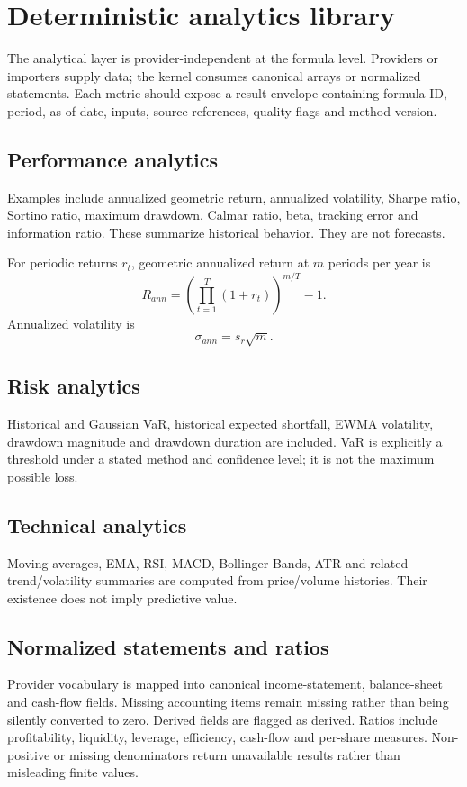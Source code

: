 \documentclass[11pt]{article}
\begin{document}
\section{Deterministic analytics library}
The analytical layer is provider-independent at the formula level. Providers or importers supply data; the kernel consumes canonical arrays or normalized statements. Each metric should expose a result envelope containing formula ID, period, as-of date, inputs, source references, quality flags and method version.

\subsection{Performance analytics}
Examples include annualized geometric return, annualized volatility, Sharpe ratio, Sortino ratio, maximum drawdown, Calmar ratio, beta, tracking error and information ratio. These summarize historical behavior. They are not forecasts.

For periodic returns $r_t$, geometric annualized return at $m$ periods per year is
\begin{equation}
R_{ann}=\left(\prod_{t=1}^T(1+r_t)\right)^{m/T}-1.
\end{equation}
Annualized volatility is
\begin{equation}
\sigma_{ann}=s_r\sqrt{m}.
\end{equation}

\subsection{Risk analytics}
Historical and Gaussian VaR, historical expected shortfall, EWMA volatility, drawdown magnitude and drawdown duration are included. VaR is explicitly a threshold under a stated method and confidence level; it is not the maximum possible loss.

\subsection{Technical analytics}
Moving averages, EMA, RSI, MACD, Bollinger Bands, ATR and related trend/volatility summaries are computed from price/volume histories. Their existence does not imply predictive value.

\subsection{Normalized statements and ratios}
Provider vocabulary is mapped into canonical income-statement, balance-sheet and cash-flow fields. Missing accounting items remain missing rather than being silently converted to zero. Derived fields are flagged as derived. Ratios include profitability, liquidity, leverage, efficiency, cash-flow and per-share measures. Non-positive or missing denominators return unavailable results rather than misleading finite values.
\end{document}
